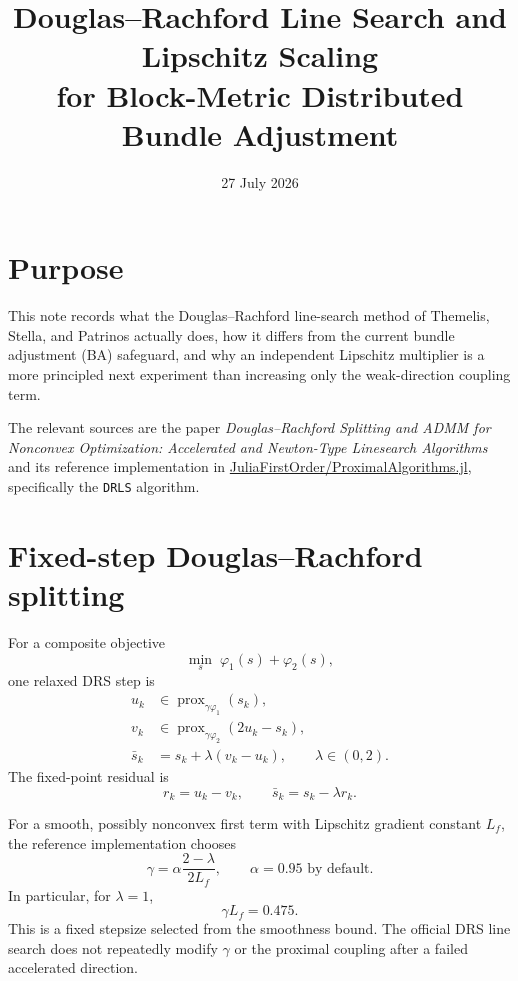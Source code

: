 \documentclass[11pt]{article}
\title{Douglas--Rachford Line Search and Lipschitz Scaling\\
for Block-Metric Distributed Bundle Adjustment}
\author{}
\date{27 July 2026}
\begin{document}
\maketitle

\section{Purpose}

This note records what the Douglas--Rachford line-search method of Themelis,
Stella, and Patrinos actually does, how it differs from the current bundle
adjustment (BA) safeguard, and why an independent Lipschitz multiplier is a
more principled next experiment than increasing only the weak-direction
coupling term.

The relevant sources are the paper
\emph{Douglas--Rachford Splitting and ADMM for Nonconvex Optimization:
Accelerated and Newton-Type Linesearch Algorithms} and its reference
implementation in
\href{https://github.com/JuliaFirstOrder/ProximalAlgorithms.jl}
{JuliaFirstOrder/ProximalAlgorithms.jl}, specifically the \texttt{DRLS}
algorithm.

\section{Fixed-step Douglas--Rachford splitting}

For a composite objective
\[
  \min_s\;\varphi_1(s)+\varphi_2(s),
\]
one relaxed DRS step is
\begin{align}
  u_k &\in \operatorname{prox}_{\gamma\varphi_1}(s_k), \\
  v_k &\in \operatorname{prox}_{\gamma\varphi_2}(2u_k-s_k), \\
  \bar s_k &= s_k+\lambda(v_k-u_k),
  \qquad \lambda\in(0,2).
\end{align}
The fixed-point residual is
\[
  r_k=u_k-v_k,
  \qquad
  \bar s_k=s_k-\lambda r_k.
\]

For a smooth, possibly nonconvex first term with Lipschitz gradient constant
$L_f$, the reference implementation chooses
\begin{equation}
  \gamma
  =\alpha\frac{2-\lambda}{2L_f},
  \qquad \alpha=0.95 \text{ by default}.
  \label{eq:gamma}
\end{equation}
In particular, for $\lambda=1$,
\begin{equation}
  \gamma L_f=0.475.
  \label{eq:default-margin}
\end{equation}
This is a fixed stepsize selected from the smoothness bound. The official DRS
line search does not repeatedly modify $\gamma$ or the proximal coupling after
a failed accelerated direction.
\end{document}
